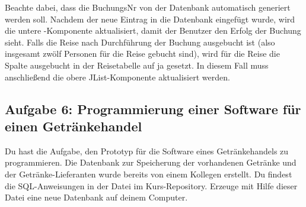 \begin{compactenum}[a)]
Beachte dabei, dass die BuchungsNr von der Datenbank automatisch generiert
werden soll. Nachdem der neue Eintrag in die Datenbank eingefügt wurde, wird
die untere -Komponente aktualisiert, damit der Benutzer den
Erfolg der Buchung sieht. Falls die Reise nach Durchführung der Buchung ausgebucht ist
(also insgesamt zwölf Personen für die Reise gebucht sind), wird für die Reise
die Spalte ausgebucht in der Reisetabelle auf ja gesetzt. In diesem Fall muss
anschließend die obere JList-Komponente aktualisiert werden.
\end{compactenum}


\subsection{Aufgabe 6: Programmierung einer Software für einen Getränkehandel}

Du hast die Aufgabe, den Prototyp für die Software eines Getränkehandels zu
programmieren. Die Datenbank zur Speicherung der vorhandenen Getränke und der
Getränke-Lieferanten wurde bereits von einem Kollegen erstellt. Du findest die
SQL-Anweisungen in der Datei  im Kurs-Repository.
Erzeuge mit Hilfe dieser Datei eine neue Datenbank auf deinem Computer.

